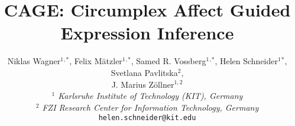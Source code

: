 \title{CAGE: Circumplex Affect Guided Expression Inference}


\author{Niklas Wagner$^{1}$$^,$$^*$, Felix Mätzler$^{1}$$^,$$^*$, Samed R. Vossberg$^{1}$$^,$$^*$, Helen Schneider$^{1}$$^*$, Svetlana Pavlitska$^{2}$, \\J. Marius Zöllner$^{1,2}$\\
\textit{$^{1}$ Karlsruhe Institute of Technology (KIT), Germany}\\
\textit{$^{2}$ FZI Research Center for Information Technology, Germany} \\
{\tt\small helen.schneider@kit.edu}\\
}

\maketitle
\def\thefootnote{*}
\copyrightnotice
\thispagestyle{empty}
\pagestyle{empty}
    






\newpage
\clearpage
{
    \small
    
    
}

% 


